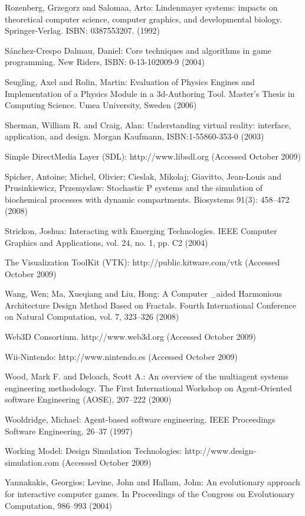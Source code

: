 \documentclass[twocolumn]{svjour3}
\begin{document}
\begin{thebibliography}{0}
Rozenberg, Grzegorz and Salomaa, Arto:
Lindenmayer systems: impacts on theoretical computer science, computer graphics, and developmental biology.
Springer-Verlag. ISBN: 0387553207. (1992)

S\'anchez-Crespo Dalmau, Daniel:
Core techniques and algorithms in game programming.
New Riders, ISBN: 0-13-102009-9 (2004)

Seugling, Axel and Rolin, Martin:
Evaluation of Physics Engines and Implementation of a Physics Module in a 3d-Authoring Tool.
Master's Thesis in Computing Science. Umea University, Sweden (2006)

Sherman, William R. and Craig, Alan:
Understanding virtual reality: interface, application, and design.
Morgan Kaufmann, ISBN:1-55860-353-0 (2003)

Simple DirectMedia Layer (SDL):
http://www.libsdl.org
(Accessed October 2009)

Spicher, Antoine; Michel, Olivier; Cieslak, Mikolaj; Giavitto, Jean-Louis and Prusinkiewicz, Przemyslaw:
Stochastic P systems and the simulation of biochemical processes with dynamic compartments.
Biosystems 91(3): 458--472 (2008)

Strickon, Joshua:
Interacting with Emerging Technologies.
IEEE Computer Graphics and Applications, vol. 24, no. 1, pp. C2 (2004)

\begin{flushleft}
The Visualization ToolKit (VTK):
http://public.kitware.com/vtk
(Accessed October 2009)
\end{flushleft}

Wang, Wen; Ma, Xueqiang and Liu, Hong:
A Computer \_aided Harmonious Architecture Design Method Based on Fractals.
Fourth International Conference on Natural Computation, vol. 7, 323--326 (2008)

Web3D Consortium.
http://www.web3d.org
(Accessed October 2009)

Wii-Nintendo:
http://www.nintendo.es
(Accessed October 2009)

Wood, Mark F. and Deloach, Scott A.:
An overview of the multiagent systems engineering methodology.
The First International Workshop on Agent-Oriented software Engineering (AOSE), 207--222 (2000)

Wooldridge, Michael:
Agent-based software engineering.
IEEE Proceedings Software Engineering, 26--37 (1997)

Working Model: Design Simulation Technologies:
http://www.design-simulation.com
(Accessed October 2009)

Yannakakis, Georgios; Levine, John and Hallam, John:
An evolutionary approach for interactive computer games.
In Proceedings of the Congress on Evolutionary Computation, 986--993 (2004)

\end{thebibliography}
\end{document}
